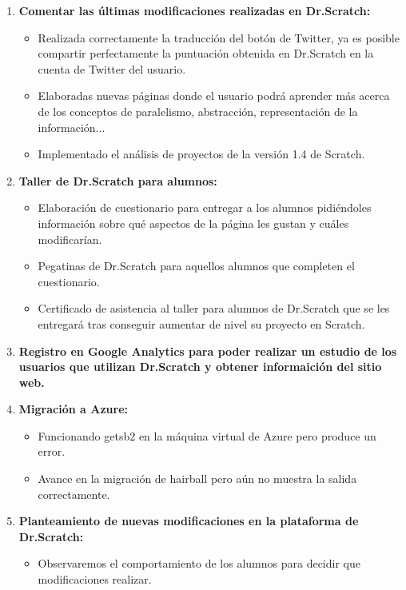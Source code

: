 \documentclass[a4paper,12pt]{letter}
\begin{document}
\begin{letter}
\begin{enumerate}
    
    \item {\textbf {Comentar las últimas modificaciones realizadas en Dr.Scratch:}}
    \begin{itemize}
        \item {Realizada correctamente la traducción del botón de Twitter, ya es posible compartir perfectamente la puntuación obtenida en Dr.Scratch en la cuenta de Twitter del usuario.}
        \item {Elaboradas nuevas páginas donde el usuario podrá aprender más acerca de los conceptos de paralelismo, abstracción, representación de la información...}
        \item {Implementado el análisis de proyectos de la versión 1.4 de Scratch.}
    \end{itemize}

    \item {\textbf {Taller de Dr.Scratch para alumnos:}}
    \begin{itemize}
        \item {Elaboración de cuestionario para entregar a los alumnos pidiéndoles información sobre qué aspectos de la página les gustan y cuáles modificarían.}
        \item {Pegatinas de Dr.Scratch para aquellos alumnos que completen el cuestionario.}
        \item {Certificado de asistencia al taller para alumnos de Dr.Scratch que se les entregará tras conseguir aumentar de nivel su proyecto en Scratch.}
    \end{itemize}

    \item{\textbf {Registro en Google Analytics para poder realizar un estudio de los usuarios que utilizan Dr.Scratch y obtener informaición del sitio web.}}

    \item{\textbf {Migración a Azure:}}
    \begin{itemize}
        \item {Funcionando getsb2 en la máquina virtual de Azure pero produce un error.}
        \item {Avance en la migración de hairball pero aún no muestra la salida correctamente.}
    \end{itemize}
	\item{\textbf {Planteamiento de nuevas modificaciones en la plataforma de Dr.Scratch:}}
    \begin{itemize}
        \item {Observaremos el comportamiento de los alumnos para decidir que modificaciones realizar.}
    \end{itemize}


\end{enumerate}
\end{letter}
\end{document}
